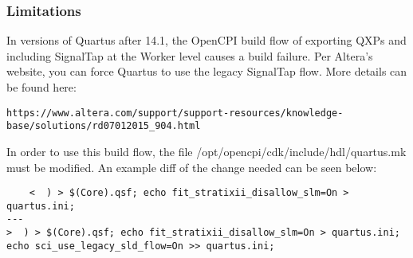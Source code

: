 \begin{flushleft}
	\subsubsection{Limitations}
	In versions of Quartus after 14.1, the OpenCPI build flow of exporting QXPs and including SignalTap at the Worker level causes a build failure. Per Altera's website, you can force Quartus to use the legacy SignalTap flow. More details can be found here: \begin{verbatim}https://www.altera.com/support/support-resources/knowledge-base/solutions/rd07012015_904.html\end{verbatim}
	In order to use this build flow, the file /opt/opencpi/cdk/include/hdl/quartus.mk must be modified. An example diff of the change needed can be seen below:
	\scriptsize\begin{verbatim}
	<  ) > $(Core).qsf; echo fit_stratixii_disallow_slm=On > quartus.ini;
---
>  ) > $(Core).qsf; echo fit_stratixii_disallow_slm=On > quartus.ini; echo sci_use_legacy_sld_flow=On >> quartus.ini;
	\end{verbatim}\normalsize

\end{flushleft}
